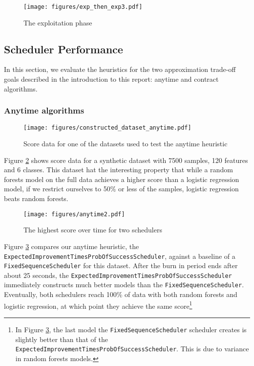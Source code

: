 \documentclass[a4paper,12pt,twoside,openright]{report}
\begin{document}
\begin{figure}
\centering
  \texttt{[image: figures/exp\_then\_exp3.pdf]}
  \caption{The exploitation phase}
  \label{sched:exp_then_exp3}
\end{figure}



\subsection{Scheduler Performance}
In this section, we evaluate the heuristics for the two approximation trade-off goals described in the introduction to this report: anytime and contract algorithms.


\subsubsection{Anytime algorithms}

\begin{figure}
\centering
  \texttt{[image: figures/constructed\_dataset\_anytime.pdf]}
  \caption{Score data for one of the datasets used to test the anytime heuristic}
  \label{constructed_dataset_anytime}
\end{figure}

Figure \ref{constructed_dataset_anytime} shows score data for a synthetic dataset with 7500 samples, 120 features and 6 classes. This dataset hat the interesting property that while a random forests model on the full data achieves a higher score than a logistic regression model, if we restrict ourselves to 50\% or less of the samples, logistic regression beats random forests.


\begin{figure}
\centering
  \texttt{[image: figures/anytime2.pdf]}
  \caption{The highest score over time for two schedulers}
  \label{anytime2}
\end{figure}



Figure \ref{anytime2} compares our anytime heuristic, the \texttt{ExpectedImprovementTimesProbOfSuccessScheduler}, against a baseline of a \texttt{FixedSequenceScheduler} for this dataset. After the burn in period ends after about 25 seconds, the \texttt{ExpectedImprovementTimesProbOfSuccessScheduler} immediately constructs much better models than the \texttt{FixedSequenceScheduler}. Eventually, both schedulers reach 100\% of data with both random forests and logistic regression, at which point they achieve the same score\footnote{In Figure \ref{anytime2}, the last model the \texttt{FixedSequenceScheduler} scheduler creates is slightly better than that of the \texttt{ExpectedImprovementTimesProbOfSuccessScheduler}. This is due to variance in random forests models.}
\end{document}
